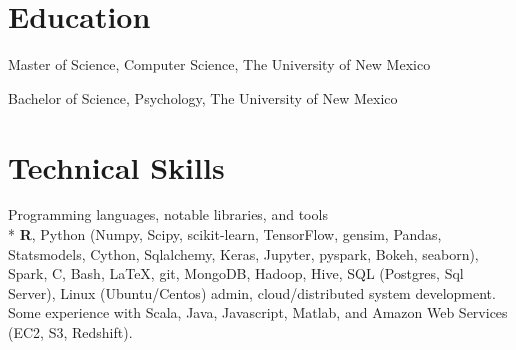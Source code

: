 \documentclass[print]{friggeri-cv} %
\begin{document}
\section{Education}
\begin{description}
  \item {\largeheaderfont Master of Science, Computer Science}, The University
    of New Mexico \hfill 
    {}
  \item  {\largeheaderfont Bachelor of Science, Psychology}, The University of
    New Mexico \hfill
    { }
\end{description}

\section{Technical Skills}
\begin{description}
   \item {\smallheaderfont Programming languages, notable libraries, and tools} \\*
        \textbf{R}, Python (Numpy, Scipy, scikit-learn, TensorFlow, gensim,
        Pandas, Statsmodels, Cython, Sqlalchemy, Keras, Jupyter, pyspark,
        Bokeh, seaborn), Spark, C, Bash,
        \LaTeX, git, MongoDB, Hadoop, Hive, SQL (Postgres,
        Sql Server), Linux (Ubuntu/Centos) admin, cloud/distributed system development.
        Some experience with Scala, Java, Javascript,
        Matlab, and Amazon Web Services (EC2, S3, Redshift).

\end{description}
\end{document}
